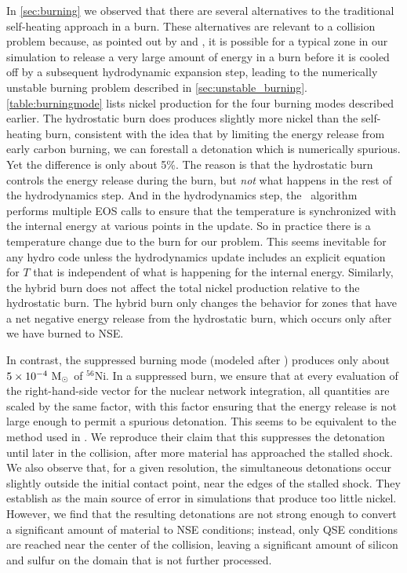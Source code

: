 \documentclass[12pt]{article}
\begin{document}
In \autoref{sec:burning} we observed that there are several alternatives to the traditional
self-heating approach in a burn. These alternatives are relevant to a collision problem because,
as pointed out by \cite{raskin:2010} and \cite{kushnir:2013}, it is possible for a typical
zone in our simulation to release a very large amount of energy in a burn before it is cooled
off by a subsequent hydrodynamic expansion step, leading to the numerically unstable burning
problem described in \autoref{sec:unstable_burning}. \autoref{table:burningmode} lists nickel
production for the four burning modes described earlier. The hydrostatic burn does produces
slightly more nickel than the self-heating burn, consistent with the idea that by limiting the
energy release from early carbon burning, we can forestall a detonation which is numerically
spurious. Yet the difference is only about 5\%. The reason is that the hydrostatic burn controls
the energy release during the burn, but \textit{not} what happens in the rest of the hydrodynamics
step. And in the hydrodynamics step, the \castro\ algorithm performs multiple EOS calls to ensure
that the temperature is synchronized with the internal energy at various points in the update.
So in practice there is a temperature change due to the burn for our problem. This seems inevitable
for any hydro code unless the hydrodynamics update includes an explicit equation for $T$ that is
independent of what is happening for the internal energy. Similarly, the hybrid burn does not
affect the total nickel production relative to the hydrostatic burn. The hybrid burn only changes
the behavior for zones that have a net negative energy release from the hydrostatic burn, which
occurs only after we have burned to NSE.



In contrast, the suppressed burning mode (modeled after \citet{kushnir:2013}) produces only about
$5 \times 10^{-4}\ \mathrm{M}_\odot$ of $^{56}$Ni. In a suppressed burn, we ensure that at every evaluation
of the right-hand-side vector for the nuclear network integration, all quantities are scaled by the
same factor, with this factor ensuring that the energy release is not large enough to permit a
spurious detonation. This seems to be equivalent to the method used in \citet{kushnir:2013}. We
reproduce their claim that this suppresses the detonation until later in the collision, after more
material has approached the stalled shock. We also observe that, for a given resolution, the simultaneous
detonations occur slightly outside the initial contact point, near the edges of the stalled shock. They
establish as the main source of error in simulations that produce too little nickel. However, we find
that the resulting detonations are not strong enough to convert a significant amount of material to NSE
conditions; instead, only QSE conditions are reached near the center of the collision, leaving a significant
amount of silicon and sulfur on the domain that is not further processed.
\end{document}
